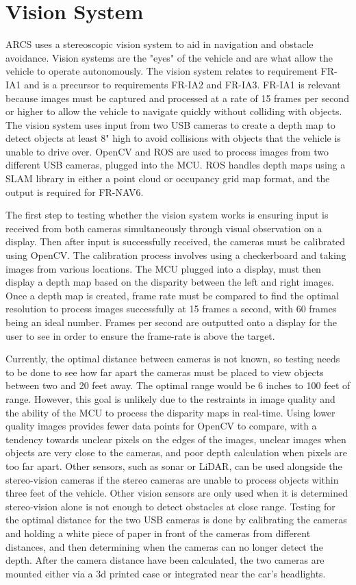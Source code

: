 \documentclass[compsoc,draftclsnofoot,onecolumn,10pt]{IEEEtran}
\begin{document}
\section{Vision System}
ARCS uses a stereoscopic vision system to aid in navigation and obstacle avoidance. 
Vision systems are the "eyes" of the vehicle and are what allow the vehicle to operate autonomously. 
The vision system relates to requirement FR-IA1 and is a precursor to requirements FR-IA2 and FR-IA3. 
FR-IA1 is relevant because images must be captured and processed at a rate of 15 frames per second or higher to allow the vehicle to navigate quickly without colliding with objects.
The vision system uses input from two USB cameras to create a depth map to detect objects at least 8" high to avoid collisions with objects that the vehicle is unable to drive over. 
OpenCV and ROS are used to process images from two different USB cameras, plugged into the MCU.  
ROS handles depth maps using a SLAM library in either a point cloud or occupancy grid map format, and the output is required for FR-NAV6. \par
The first step to testing whether the vision system works is ensuring input is received from both cameras simultaneously through visual observation on a display. Then after input is successfully received, the cameras must be calibrated using OpenCV. The calibration process involves using a checkerboard and taking images from various locations. The MCU plugged into a display, must then display a depth map based on the disparity between the left and right images. 
Once a depth map is created, frame rate must be compared to find the optimal resolution to process images successfully at 15 frames a second, with 60 frames being an ideal number. Frames per second are outputted onto a display for the user to see in order to ensure the frame-rate is above the target. \par
Currently, the optimal distance between cameras is not known, so testing needs to be done to see how far apart the cameras must be placed to view objects between two and 20 feet away. The optimal range would be 6 inches to 100 feet of range. However, this goal is unlikely due to the restraints in image quality and the ability of the MCU to process the disparity maps in real-time. Using lower quality images provides fewer data points for OpenCV to compare, with a tendency towards unclear pixels on the edges of the images, unclear images when objects are very close to the cameras, and poor depth calculation when pixels are too far apart. 
Other sensors, such as sonar or LiDAR, can be used alongside the stereo-vision cameras if the stereo cameras are unable to process objects within three feet of the vehicle. Other vision sensors are only used when it is determined stereo-vision alone is not enough to detect obstacles at close range. 
Testing for the optimal distance for the two USB cameras is done by calibrating the cameras and holding a white piece of paper in front of the cameras from different distances, and then determining when the cameras can no longer detect the depth. 
After the camera distance have been calculated, the two cameras are mounted either via a 3d printed case or integrated near the car's headlights. 
\end{document}
